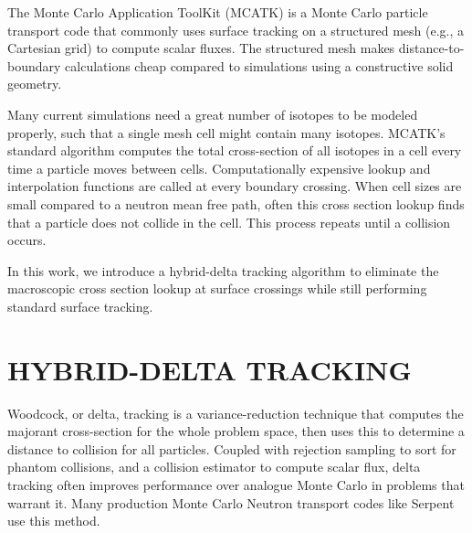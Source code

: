 The Monte Carlo Application ToolKit (MCATK) \cite{mcatk} is a Monte Carlo particle transport code that commonly uses surface tracking on a structured mesh (e.g., a Cartesian grid) to compute scalar fluxes.
The structured mesh makes distance-to-boundary calculations cheap compared to simulations using a constructive solid geometry.

Many current simulations need a great number of isotopes to be modeled properly, such that a single mesh cell might contain many isotopes. 
MCATK's standard algorithm computes the total cross-section of all isotopes in a cell every time a particle moves between cells.
Computationally expensive lookup and interpolation functions are called at every boundary crossing.
When cell sizes are small compared to a neutron mean free path, often this cross section lookup finds that a particle does not collide in the cell.
This process repeats until a collision occurs.

In this work, we introduce a hybrid-delta tracking algorithm to eliminate the macroscopic cross section lookup at surface crossings while still performing standard surface tracking.

\section{HYBRID-DELTA TRACKING}
\label{sec:mcatkmethod}

Woodcock, or delta, tracking \cite{woodcock_techniques_1965} is a variance-reduction technique that computes the majorant cross-section for the whole problem space, then uses this to determine a distance to collision for all particles.
Coupled with rejection sampling to sort for phantom collisions, and a collision estimator to compute scalar flux, delta tracking often improves performance over analogue Monte Carlo in problems that warrant it.
Many production Monte Carlo Neutron transport codes like Serpent \cite{leppanen_development_2013} use this method.

